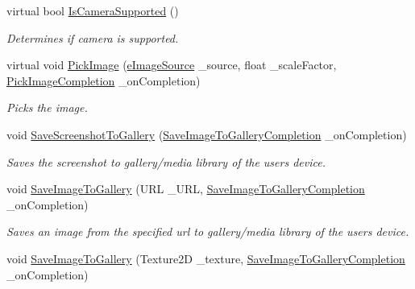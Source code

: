 \begin{DoxyCompactItemize}
\item 
virtual bool \hyperlink{class_voxel_busters_1_1_native_plugins_1_1_media_library_af2368db810c73e2f4cb13ba65484c420}{Is\+Camera\+Supported} ()
\begin{DoxyCompactList}\small\item\em Determines if camera is supported. \end{DoxyCompactList}\item 
virtual void \hyperlink{class_voxel_busters_1_1_native_plugins_1_1_media_library_abbccbd69133420708fd4d61d720e2a71}{Pick\+Image} (\hyperlink{namespace_voxel_busters_1_1_native_plugins_a7c22ee0fa98a425137dcfc6463ddfc2c}{e\+Image\+Source} \+\_\+source, float \+\_\+scale\+Factor, \hyperlink{class_voxel_busters_1_1_native_plugins_1_1_media_library_a95dd54d80020c5ba3c14361984b098c7}{Pick\+Image\+Completion} \+\_\+on\+Completion)
\begin{DoxyCompactList}\small\item\em Picks the image. \end{DoxyCompactList}\item 
void \hyperlink{class_voxel_busters_1_1_native_plugins_1_1_media_library_ac02352f342e714e86ae3b2054dc59485}{Save\+Screenshot\+To\+Gallery} (\hyperlink{class_voxel_busters_1_1_native_plugins_1_1_media_library_a2dc4a641f32b69e42c223332fa7dfebd}{Save\+Image\+To\+Gallery\+Completion} \+\_\+on\+Completion)
\begin{DoxyCompactList}\small\item\em Saves the screenshot to gallery/media library of the users device. \end{DoxyCompactList}\item 
void \hyperlink{class_voxel_busters_1_1_native_plugins_1_1_media_library_a344a5d82071e4da51af9d1e279bd0fc7}{Save\+Image\+To\+Gallery} (U\+R\+L \+\_\+\+U\+R\+L, \hyperlink{class_voxel_busters_1_1_native_plugins_1_1_media_library_a2dc4a641f32b69e42c223332fa7dfebd}{Save\+Image\+To\+Gallery\+Completion} \+\_\+on\+Completion)
\begin{DoxyCompactList}\small\item\em Saves an image from the specified url to gallery/media library of the users device. \end{DoxyCompactList}\item 
void \hyperlink{class_voxel_busters_1_1_native_plugins_1_1_media_library_a2d7bd812342f26b6ef41af91d4486c50}{Save\+Image\+To\+Gallery} (Texture2\+D \+\_\+texture, \hyperlink{class_voxel_busters_1_1_native_plugins_1_1_media_library_a2dc4a641f32b69e42c223332fa7dfebd}{Save\+Image\+To\+Gallery\+Completion} \+\_\+on\+Completion)

\end{DoxyCompactItemize}

